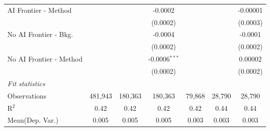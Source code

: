 \begin{tabular}{lcccccc}
   AI Frontier - Method    &                &                 & -0.0002         &           &           & -0.00001\\   
                           &                &                 & (0.0002)        &           &           & (0.0003)\\   
   No AI Frontier - Bkg.   &                &                 & -0.0004         &           &           & -0.0001\\   
                           &                &                 & (0.0002)        &           &           & (0.0002)\\   
   No AI Frontier - Method &                &                 & -0.0006$^{***}$ &           &           & 0.00002\\   
                           &                &                 & (0.0002)        &           &           & (0.0002)\\   
   \midrule
   \emph{Fit statistics}\\
   Observations            & 481,943        & 180,363         & 180,363         & 79,868    & 28,790    & 28,790\\  
   R$^2$                   & 0.42           & 0.42            & 0.42            & 0.42      & 0.44      & 0.44\\  
Mean(Dep. Var.) & 0.005 & 0.005 & 0.005 & 0.003 & 0.003 & 0.003 \\
   

\end{tabular}
